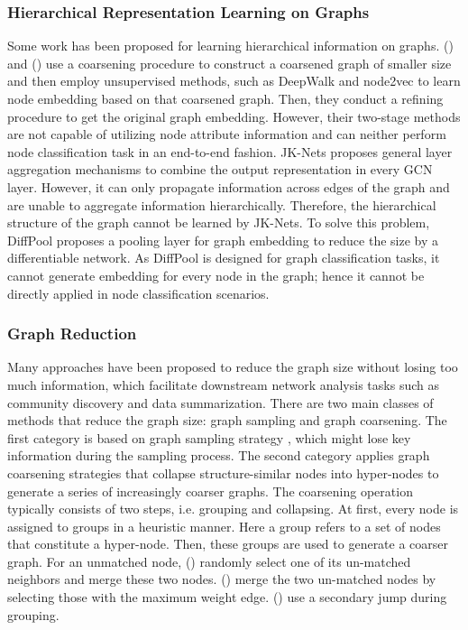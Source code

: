 \documentclass{article}
\begin{document}
\subsubsection{Hierarchical Representation Learning on Graphs}
Some work has been proposed for learning hierarchical information on graphs. \citeauthor{AAAI1816273} (\citeyear{AAAI1816273}) and \citeauthor{2018arXiv180209612L} (\citeyear{2018arXiv180209612L}) use a coarsening procedure to construct a coarsened graph of smaller size and then employ unsupervised methods, such as DeepWalk \cite{Perozzi:2014:DOL:2623330.2623732} and node2vec \cite{Grover:2016:NSF:2939672.2939754} to learn node embedding based on that coarsened graph. Then, they conduct a refining procedure to get the original graph embedding. However, their two-stage methods are not capable of utilizing node attribute information and can neither perform node classification task in an end-to-end fashion. JK-Nets \cite{pmlr-v80-xu18c} proposes general layer aggregation mechanisms to combine the output representation in every GCN layer. However, it can only propagate information across edges of the graph and are unable to aggregate information hierarchically. Therefore, the hierarchical structure of the graph cannot be learned by JK-Nets. To solve this problem, DiffPool \cite{Ying2018HierarchicalGR} proposes a pooling layer for graph embedding to reduce the size by a differentiable network. As DiffPool is designed for graph classification tasks, it cannot generate embedding for every node in the graph; hence it cannot be directly applied in node classification scenarios.

\subsubsection{Graph Reduction}
Many approaches have been proposed to reduce the graph size without losing too much information, which facilitate downstream network analysis tasks such as community discovery and data summarization. There are two main classes of methods that reduce the graph size: graph sampling and graph coarsening. The first category is based on graph sampling strategy \cite{6104045,DBLP:journals/corr/HuL13,8000122}, which might lose key information during the sampling process. The second category applies graph coarsening strategies that collapse structure-similar nodes into hyper-nodes to generate a series of increasingly coarser graphs. The coarsening operation typically consists of two steps, i.e. grouping and collapsing. At first, every node is assigned to groups in a heuristic manner. Here a group refers to a set of nodes that constitute a hyper-node. Then, these groups are used to generate a coarser graph. For an unmatched node, \citeauthor{Hendrickson:1995:MAP:224170.224228} (\citeyear{Hendrickson:1995:MAP:224170.224228}) randomly select one of its un-matched neighbors and merge these two nodes. \citeauthor{doi:10.1137/S1064827595287997} (\citeyear{doi:10.1137/S1064827595287997}) merge the two un-matched nodes by selecting those with the maximum weight edge. \citeauthor{LaSalle:2015:MMB:2780684.2780857} (\citeyear{LaSalle:2015:MMB:2780684.2780857}) use a secondary jump during grouping.
\end{document}
